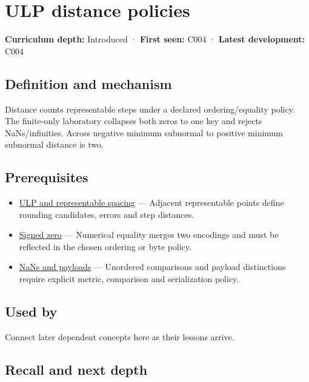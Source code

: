 \hypertarget{appendix-deca299ae4b8}{}
\section{ULP distance policies}\label{appendix-deca299ae4b8-ulp-distance-policies}

\textbf{Curriculum depth:} Introduced · \textbf{First seen:} C004 · \textbf{Latest development:} C004

\subsection{Definition and mechanism}\label{appendix-deca299ae4b8-definition-and-mechanism}

Distance counts representable steps under a declared ordering/equality policy. The finite-only laboratory collapses both zeros to one key and rejects NaNs/infinities. Across negative minimum subnormal to positive minimum subnormal distance is two.

\subsection{Prerequisites}\label{appendix-deca299ae4b8-prerequisites}

\begin{itemize}
\tightlist
\item
  \hyperref[appendix-14bab4cab9d4]{ULP and representable spacing} --- Adjacent representable points define rounding candidates, errors and step distances.
\item
  \hyperref[appendix-3a048f032c1f]{Signed zero} --- Numerical equality merges two encodings and must be reflected in the chosen ordering or byte policy.
\item
  \hyperref[appendix-d6607cc4c235]{NaNs and payloads} --- Unordered comparisons and payload distinctions require explicit metric, comparison and serialization policy.
\end{itemize}

\subsection{Used by}\label{appendix-deca299ae4b8-used-by}

Connect later dependent concepts here as their lessons arrive.

\subsection{Recall and next depth}\label{appendix-deca299ae4b8-recall-and-next-depth}

